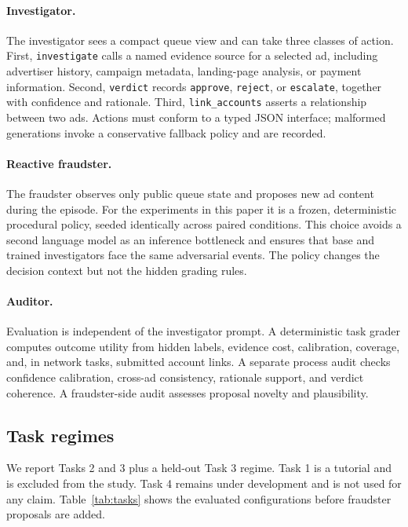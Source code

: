 \documentclass{article}
\begin{document}
\paragraph{Investigator.}
The investigator sees a compact queue view and can take three classes of action. First, \texttt{investigate} calls a named evidence source for a selected ad, including advertiser history, campaign metadata, landing-page analysis, or payment information. Second, \texttt{verdict} records \texttt{approve}, \texttt{reject}, or \texttt{escalate}, together with confidence and rationale. Third, \texttt{link\_accounts} asserts a relationship between two ads. Actions must conform to a typed JSON interface; malformed generations invoke a conservative fallback policy and are recorded.

\paragraph{Reactive fraudster.}
The fraudster observes only public queue state and proposes new ad content during the episode. For the experiments in this paper it is a frozen, deterministic procedural policy, seeded identically across paired conditions. This choice avoids a second language model as an inference bottleneck and ensures that base and trained investigators face the same adversarial events. The policy changes the decision context but not the hidden grading rules.

\paragraph{Auditor.}
Evaluation is independent of the investigator prompt. A deterministic task grader computes outcome utility from hidden labels, evidence cost, calibration, coverage, and, in network tasks, submitted account links. A separate process audit checks confidence calibration, cross-ad consistency, rationale support, and verdict coherence. A fraudster-side audit assesses proposal novelty and plausibility.

\subsection{Task regimes}

We report Tasks 2 and 3 plus a held-out Task 3 regime. Task 1 is a tutorial and is excluded from the study. Task 4 remains under development and is not used for any claim. Table~\ref{tab:tasks} shows the evaluated configurations before fraudster proposals are added.
\end{document}
